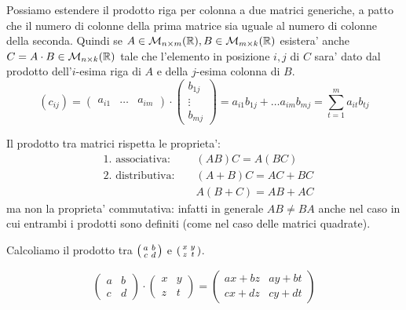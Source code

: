 Possiamo estendere il prodotto riga per colonna a due matrici generiche, a patto che il numero di colonne della prima matrice sia uguale al numero di colonne della seconda.
Quindi se $A \in \mathcal{M}_{n \times m}(\mathbb{R}), B \in \mathcal{M}_{m \times k}(\mathbb{R})$ esistera' anche $C = A \cdot B \in \mathcal{M}_{n \times k}(\mathbb{R})$ tale che l'elemento in posizione $i, j$ di $C$ sara' dato dal prodotto dell'$i$-esima riga di $A$ e della $j$-esima colonna di $B$.
\begin{equation}
    (c_{ij}) = \begin{pmatrix}
        a_{i1} & \dots & a_{im} 
    \end{pmatrix} \cdot \begin{pmatrix}
        b_{1j} \\ \vdots \\ b_{mj}
    \end{pmatrix} = a_{i1}b_{1j} + \dots a_{im}b_{mj} = \sum_{t = 1}^m a_{it}b_{tj}
\end{equation} 

Il prodotto tra matrici rispetta le proprieta':
\begin{align*}
    &\text{1. associativa: }    && (AB)C = A(BC) \\
    &\text{2. distributiva: }   && (A + B)C = AC + BC \\
    &                           && A(B + C) = AB + AC
\end{align*}
ma non la proprieta' commutativa: infatti in generale $AB \neq BA$ anche nel caso in cui entrambi i prodotti sono definiti (come nel caso delle matrici quadrate). 

\begin{example}
    Calcoliamo il prodotto tra $\begin{psmallmatrix} a & b \\ c & d \end{psmallmatrix}$ e $\begin{psmallmatrix} x & y\\ z & t \end{psmallmatrix}$.
\end{example}
\begin{solution}
    \begin{equation*}
        \begin{pmatrix} a & b \\ c & d \end{pmatrix} \cdot \begin{pmatrix} x & y\\ z & t \end{pmatrix} = \begin{pmatrix}
            ax + bz & ay + bt \\ cx + dz & cy + dt
        \end{pmatrix}
    \end{equation*}
\end{solution}

